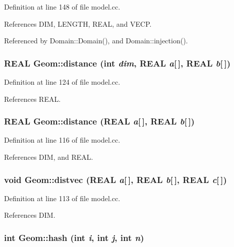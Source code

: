 Definition at line 148 of file model.cc.

References DIM, LENGTH, REAL, and VECP.

Referenced by Domain::Domain(), and Domain::injection().\hypertarget{namespaceGeom_1277bdb3dcb8cc8ccd5328d003ee7355}{
\subsubsection[{distance}]{\setlength{\rightskip}{0pt plus 5cm}REAL Geom::distance (int {\em dim}, \/  REAL {\em a}\mbox{[}$\,$\mbox{]}, \/  REAL {\em b}\mbox{[}$\,$\mbox{]})}}
\label{namespaceGeom_1277bdb3dcb8cc8ccd5328d003ee7355}




Definition at line 124 of file model.cc.

References REAL.\hypertarget{namespaceGeom_8ffc25d21d218413f26b8633aa5d892c}{
\subsubsection[{distance}]{\setlength{\rightskip}{0pt plus 5cm}REAL Geom::distance (REAL {\em a}\mbox{[}$\,$\mbox{]}, \/  REAL {\em b}\mbox{[}$\,$\mbox{]})}}
\label{namespaceGeom_8ffc25d21d218413f26b8633aa5d892c}




Definition at line 116 of file model.cc.

References DIM, and REAL.\hypertarget{namespaceGeom_6bbaf6733aab04a39e7af8e251cd86e0}{
\subsubsection[{distvec}]{\setlength{\rightskip}{0pt plus 5cm}void Geom::distvec (REAL {\em a}\mbox{[}$\,$\mbox{]}, \/  REAL {\em b}\mbox{[}$\,$\mbox{]}, \/  REAL {\em c}\mbox{[}$\,$\mbox{]})}}
\label{namespaceGeom_6bbaf6733aab04a39e7af8e251cd86e0}




Definition at line 113 of file model.cc.

References DIM.\hypertarget{namespaceGeom_404fb266d9c4a55df9844e29cd64e949}{
\subsubsection[{hash}]{\setlength{\rightskip}{0pt plus 5cm}int Geom::hash (int {\em i}, \/  int {\em j}, \/  int {\em n})}}
\label{namespaceGeom_404fb266d9c4a55df9844e29cd64e949}




